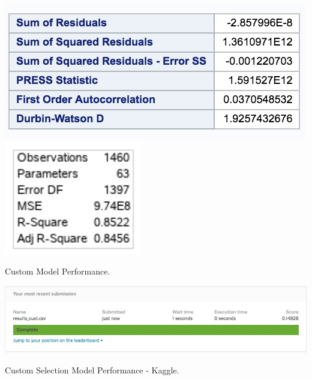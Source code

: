 \documentclass[11pt]{scrartcl} %
\begin{document}
\begin{table}[H] %
	\centering %
	\includegraphics[scale=.3]{../graphics/A2Custresults}\\
	\includegraphics[scale=.3]{../graphics/A2CustR2}
	\caption{Custom Model Performance.}
	\label{tab:A2Custperf}
\end{table}
\hrulefill
\begin{table}[H] %
	\centering %
	\includegraphics[scale=.4]{../graphics/A2CustKaggle}
	\caption{Custom Selection Model Performance - Kaggle.}
	\label{tab:A2CustKaggle}
\end{table}
\hrulefill
\pagebreak
\end{document}
